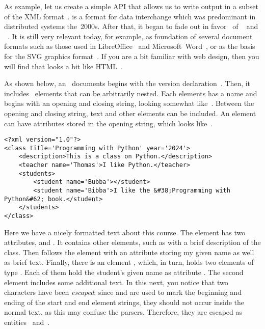 As example, let us create a simple API that allows us to write output in a subset of the \acrfull{XML} format~\cite{BPSMM2008EMLX1FE,K2019ITXJY,CH2013XFCAMLTMC}.
 is a format for data interchange which was predominant in distributed systems the~2000s.
After that, it began to fade out in favor~\cite{A2020XLATDOEOL} of ~\cite{E2017SE4TJDIS,B2017TJONJDIF} and ~\cite{DNMAASBE2021YAMLYV1,K2019ITXJY,CGTYB2022YFFDCAIE}.
It is still very relevant today, for example, as foundation of several document formats such as those used in LibreOffice~\cite{DF2024LTDF,GL2012LTSOOSSCBAFACSOL} and Microsoft~Word~\cite{MS2024MW,DR2019STFAWAUMW}, or as the basis for the SVG graphics format~\cite{DDGLMSWFJJ2011SVGSSE}.
If you are a bit familiar with web design, then you will find that  looks a bit like HTML~\cite{HBFLDNOP2014HAVAAAFHAX}.%
%
\begin{sloppypar}%
As shown below, an ~documents begins with the  version declaration~.
Then, it includes ~elements that can be arbitrarily nested.
Each elements has a name and begins with an opening and closing string, looking somewhat like~.
Between the opening and closing string, text and other elements can be included.
An element can have attributes stored in the opening string, which looks like~.%
\end{sloppypar}%
%
\begin{center}
\begin{minipage}{\linewidth}%
\begin{lstlisting}[style=xml_style]
<?xml version="1.0"?>
<class title='Programming with Python' year='2024'>
    <description>This is a class on Python.</description>
    <teacher name='Thomas'>I like Python.</teacher>
    <students>
        <student name='Bubba'></student>
        <student name='Bibba'>I like the &#38;Programming with Python&#62; book.</student>
    </students>
</class>
\end{lstlisting}%
\end{minipage}%
\end{center}%
%
Here we have a nicely formatted  text about this course.
The  element has two attributes,  and .
It contains other elements, such as  with a brief description of the class.
Then follows the element  with an attribute storing my given name as well as brief text.
Finally, there is an element , which, in turn, holds two elements of type .
Each of them hold the student's given name as attribute .
The second  element includes some additional text.
In this next, you notice that two characters have been \emph{escaped}: since \textil{<} and \textil{>} are used to mark the beginning and ending of the start and end element strings, they should not occur inside the normal text, as this may confuse the  parsers.
Therefore, they are escaped as entities~ and~.

